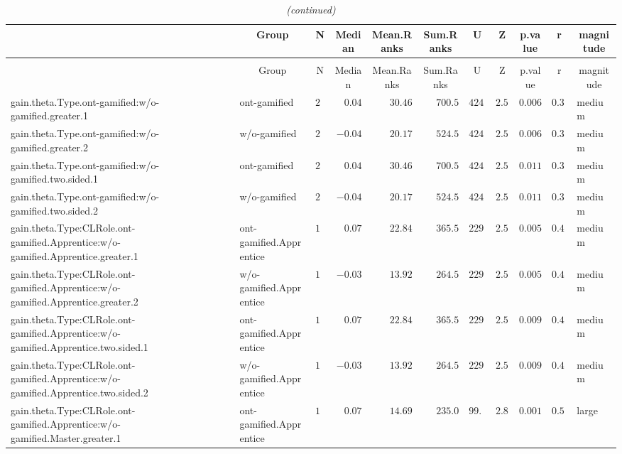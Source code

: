 \documentclass[6pt]{article}
\begin{document}
\setlongtables\begin{landscape}{\scriptsize
\begin{longtable}{llrrrrrrrrl}\caption{Descriptive statistic of the pair wilcoxon analysis } \tabularnewline
\hline\hline
\multicolumn{1}{l}{}&\multicolumn{1}{c}{Group}&\multicolumn{1}{c}{N}&\multicolumn{1}{c}{Median}&\multicolumn{1}{c}{Mean.Ranks}&\multicolumn{1}{c}{Sum.Ranks}&\multicolumn{1}{c}{U}&\multicolumn{1}{c}{Z}&\multicolumn{1}{c}{p.value}&\multicolumn{1}{c}{r}&\multicolumn{1}{c}{magnitude}\tabularnewline
\hline
\endfirsthead\caption[]{\em (continued)} \tabularnewline
\hline
\multicolumn{1}{l}{}&\multicolumn{1}{c}{Group}&\multicolumn{1}{c}{N}&\multicolumn{1}{c}{Median}&\multicolumn{1}{c}{Mean.Ranks}&\multicolumn{1}{c}{Sum.Ranks}&\multicolumn{1}{c}{U}&\multicolumn{1}{c}{Z}&\multicolumn{1}{c}{p.value}&\multicolumn{1}{c}{r}&\multicolumn{1}{c}{magnitude}\tabularnewline
\hline
\endhead
\hline
\endfoot
\label{result}
gain.theta.Type.ont-gamified:w/o-gamified.greater.1&ont-gamified&$23$&$ 0.04$&$30.46$&$700.5$&$424.5$&$2.51$&$0.006$&$0.359$&medium\tabularnewline
gain.theta.Type.ont-gamified:w/o-gamified.greater.2&w/o-gamified&$26$&$-0.04$&$20.17$&$524.5$&$424.5$&$2.51$&$0.006$&$0.359$&medium\tabularnewline
gain.theta.Type.ont-gamified:w/o-gamified.two.sided.1&ont-gamified&$23$&$ 0.04$&$30.46$&$700.5$&$424.5$&$2.51$&$0.011$&$0.359$&medium\tabularnewline
gain.theta.Type.ont-gamified:w/o-gamified.two.sided.2&w/o-gamified&$26$&$-0.04$&$20.17$&$524.5$&$424.5$&$2.51$&$0.011$&$0.359$&medium\tabularnewline
gain.theta.Type:CLRole.ont-gamified.Apprentice:w/o-gamified.Apprentice.greater.1&ont-gamified.Apprentice&$16$&$ 0.07$&$22.84$&$365.5$&$229.5$&$2.57$&$0.005$&$0.434$&medium\tabularnewline
gain.theta.Type:CLRole.ont-gamified.Apprentice:w/o-gamified.Apprentice.greater.2&w/o-gamified.Apprentice&$19$&$-0.03$&$13.92$&$264.5$&$229.5$&$2.57$&$0.005$&$0.434$&medium\tabularnewline
gain.theta.Type:CLRole.ont-gamified.Apprentice:w/o-gamified.Apprentice.two.sided.1&ont-gamified.Apprentice&$16$&$ 0.07$&$22.84$&$365.5$&$229.5$&$2.57$&$0.009$&$0.434$&medium\tabularnewline
gain.theta.Type:CLRole.ont-gamified.Apprentice:w/o-gamified.Apprentice.two.sided.2&w/o-gamified.Apprentice&$19$&$-0.03$&$13.92$&$264.5$&$229.5$&$2.57$&$0.009$&$0.434$&medium\tabularnewline
gain.theta.Type:CLRole.ont-gamified.Apprentice:w/o-gamified.Master.greater.1&ont-gamified.Apprentice&$16$&$ 0.07$&$14.69$&$235.0$&$ 99.0$&$2.87$&$0.001$&$0.599$&large\tabularnewline

\end{longtable}}
\end{landscape}
\end{document}

